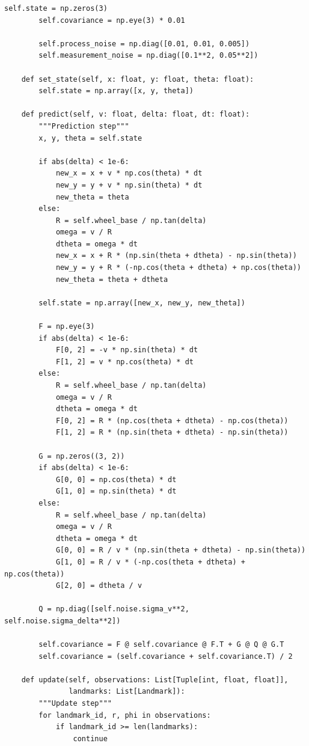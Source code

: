 \documentclass[12pt,a4paper]{report}
\begin{document}
\begin{lstlisting}[caption={Complete Simulation System (complete\_simulation.py)}]
        self.state = np.zeros(3)
        self.covariance = np.eye(3) * 0.01
        
        self.process_noise = np.diag([0.01, 0.01, 0.005])
        self.measurement_noise = np.diag([0.1**2, 0.05**2])
        
    def set_state(self, x: float, y: float, theta: float):
        self.state = np.array([x, y, theta])
        
    def predict(self, v: float, delta: float, dt: float):
        """Prediction step"""
        x, y, theta = self.state
        
        if abs(delta) < 1e-6:
            new_x = x + v * np.cos(theta) * dt
            new_y = y + v * np.sin(theta) * dt
            new_theta = theta
        else:
            R = self.wheel_base / np.tan(delta)
            omega = v / R
            dtheta = omega * dt
            new_x = x + R * (np.sin(theta + dtheta) - np.sin(theta))
            new_y = y + R * (-np.cos(theta + dtheta) + np.cos(theta))
            new_theta = theta + dtheta
        
        self.state = np.array([new_x, new_y, new_theta])
        
        F = np.eye(3)
        if abs(delta) < 1e-6:
            F[0, 2] = -v * np.sin(theta) * dt
            F[1, 2] = v * np.cos(theta) * dt
        else:
            R = self.wheel_base / np.tan(delta)
            omega = v / R
            dtheta = omega * dt
            F[0, 2] = R * (np.cos(theta + dtheta) - np.cos(theta))
            F[1, 2] = R * (np.sin(theta + dtheta) - np.sin(theta))
        
        G = np.zeros((3, 2))
        if abs(delta) < 1e-6:
            G[0, 0] = np.cos(theta) * dt
            G[1, 0] = np.sin(theta) * dt
        else:
            R = self.wheel_base / np.tan(delta)
            omega = v / R
            dtheta = omega * dt
            G[0, 0] = R / v * (np.sin(theta + dtheta) - np.sin(theta))
            G[1, 0] = R / v * (-np.cos(theta + dtheta) + np.cos(theta))
            G[2, 0] = dtheta / v
        
        Q = np.diag([self.noise.sigma_v**2, self.noise.sigma_delta**2])
        
        self.covariance = F @ self.covariance @ F.T + G @ Q @ G.T
        self.covariance = (self.covariance + self.covariance.T) / 2
        
    def update(self, observations: List[Tuple[int, float, float]], 
               landmarks: List[Landmark]):
        """Update step"""
        for landmark_id, r, phi in observations:
            if landmark_id >= len(landmarks):
                continue
            

\end{lstlisting}
\end{document}
